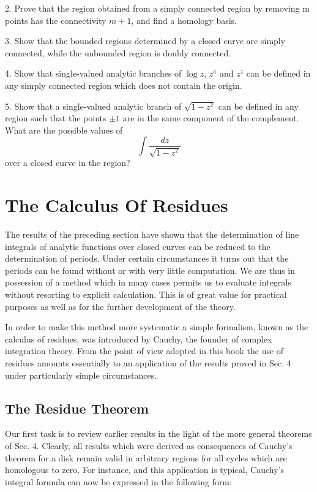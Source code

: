 2. Prove that the region obtained from a simply connected region by removing m points has the connectivity $m + 1$, and find a homology basis.

3. Show that the bounded regions determined by a closed curve are simply connected, while the unbounded region is doubly connected.

4. Show that single-valued analytic branches of $\log z$, $z^{a}$ and $z^{z}$ can be defined in any simply connected region which does not contain the origin.

5. Show that a single-valued analytic branch of $\sqrt{1-z^{2}}$ can be defined in any region such that the points $\pm1$ are in the same component of the complement. What are the possible values of
\begin{equation*}
\int \frac {d z}{\sqrt {1 - z ^ {2}}}
\end{equation*}
over a closed curve in the region?

\setcounter{section}{4}\section{The Calculus Of Residues}\label{sec:4.5}
The results of the preceding section have shown that the determination of line integrals of analytic functions over closed curves can be reduced to the determination of periods. Under certain circumstances it turns out that the periods can be found without or with very little computation. We are thus in possession of a method which in many cases permits us to evaluate integrals without resorting to explicit calculation. This is of great value for practical purposes as well as for the further development of the theory.

In order to make this method more systematic a simple formalism, known as the calculus of residues, was introduced by Cauchy, the founder of complex integration theory. From the point of view adopted in this book the use of residues amounts essentially to an application of the results proved in Sec. 4 under particularly simple circumstances.

\setcounter{section}{5}\setcounter{subsection}{0}\subsection{The Residue Theorem}\label{sec:4.5.1}
Our first task is to review earlier results in the light of the more general theorems of Sec. 4. Clearly, all results which were derived as consequences of Cauchy's theorem for a disk remain valid in arbitrary regions for all cycles which are homologous
to zero. For instance, and this application is typical, Cauchy's integral formula can now be expressed in the following form:


